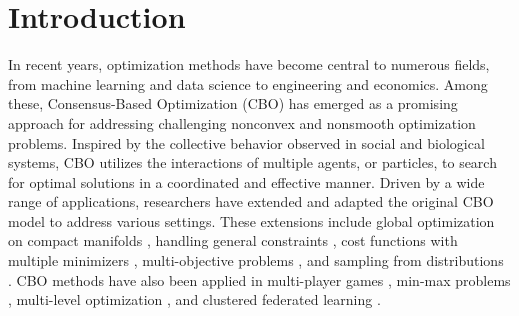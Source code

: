 \documentclass[12pt]{amsart}
\numberwithin{equation}{section}
\begin{document}









\maketitle




\section{Introduction}




In recent years, optimization methods have become central to numerous fields, from machine learning and data science to engineering and economics. Among these, Consensus-Based Optimization (CBO) \cite{pinnau2017consensus,carrillo2018analytical} has emerged as a promising approach for addressing challenging nonconvex and nonsmooth optimization problems. Inspired by the collective behavior observed in social and biological systems, CBO utilizes the interactions of multiple agents, or particles,  to search for optimal solutions in a coordinated and effective manner.  Driven by a wide range of applications, researchers have extended and adapted the original CBO model to address various settings. These extensions include global optimization on compact manifolds \cite{fornasier2021JMLR, ha2022stochastic}, handling general constraints \cite{borghi2023constrained, beddrich2024constrained}, cost functions with multiple minimizers \cite{bungert2022polarized}, multi-objective problems \cite{borghi2022consensus}, and sampling from distributions \cite{carrillo2022consensus}. CBO methods have also been applied in multi-player games \cite{chenchene2023consensus}, min-max problems \cite{huang2024consensus,borghi2024particle}, multi-level optimization  \cite{herty2024multiscale}, and clustered federated learning \cite{carrillo2023fedcbo}.
\end{document}

